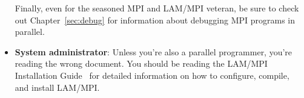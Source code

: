 \begin{itemize}
  Finally, even for the seasoned MPI and LAM/MPI veteran, be sure to
  check out Chapter~\ref{sec:debug} for information about debugging
  MPI programs in parallel.
  
  \vspace{-3pt}

\item {\bf System administrator}: Unless you're also a parallel
  programmer, you're reading the wrong document.  You should be
  reading the LAM/MPI Installation
  Guide~\cite{lamteam03:_lam_mpi_install_guide} for detailed
  information on how to configure, compile, and install LAM/MPI.
\end{itemize}

